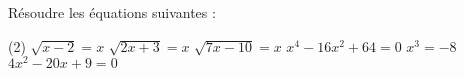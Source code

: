 %
%
Résoudre les équations suivantes :
	\begin{tasks}(2)
		\task $\sqrt{x-2}=x$
		\task $\sqrt{2x+3}=x$
		\task $\sqrt{7x-10}=x $
		\task $x^4-16x^2+64=0$
		\task $x^3 = -8$
		\task $4x^2 -20x + 9= 0$
 	\end{tasks}
